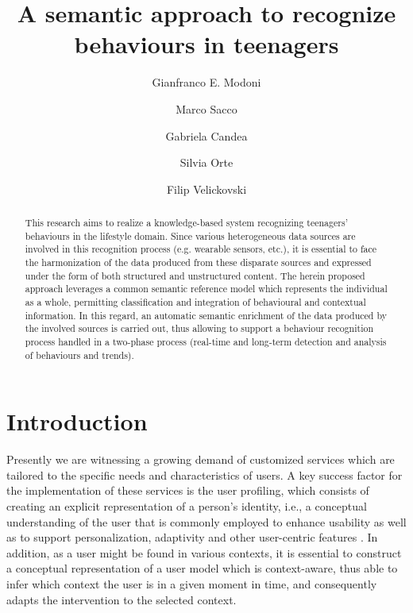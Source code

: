 \documentclass[runningheads,a4paper]{llncs}
\begin{document}
\mainmatter

\title{A semantic approach to recognize behaviours in teenagers}
\author{Gianfranco E. Modoni \and
Marco Sacco \and
Gabriela Candea \and
Silvia Orte \and
Filip Velickovski}
\maketitle

\begin{abstract}
This research aims to realize a knowledge-based system recognizing teenagers' behaviours in the lifestyle domain. Since various heterogeneous data sources are involved in this recognition process (e.g. wearable sensors, etc.), it is essential to face the harmonization of the data produced from these disparate sources and expressed under the form of both structured and unstructured content. The herein proposed approach leverages a common semantic reference model which represents the individual as a whole, permitting classification and integration of behavioural and contextual information. In this regard, an automatic semantic enrichment of the data produced by the involved sources is carried out, thus allowing to support a behaviour recognition process handled in a two-phase process (real-time and long-term detection and analysis of behaviours and trends).

\end{abstract}


\section{Introduction}

Presently we are witnessing a growing demand of customized services which are tailored to the specific needs and characteristics of users. A key success factor for the implementation of these services is the user profiling, which consists of creating an explicit representation of a person's identity, i.e., a conceptual understanding of the user  \cite{_Ref490677013} \cite{_Ref490677039} that is commonly employed to enhance usability as well as to support personalization, adaptivity and other user-centric features  \cite{_Ref490677081}. In addition, as a user might be found in various contexts, it is essential to construct a conceptual representation of a user model which is context-aware, thus able to infer which context the user is in a given moment in time, and consequently adapts the intervention to the selected context.  
\end{document}
